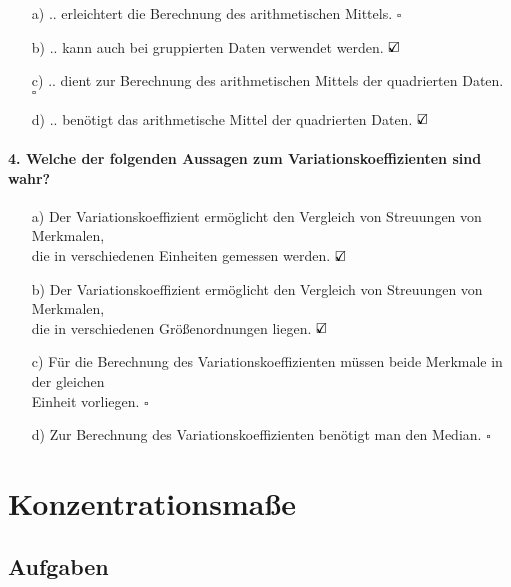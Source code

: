 \documentclass[a4paper]{article}
\begin{document}
\begin{itemize}
    \item[a)] .. erleichtert die Berechnung des arithmetischen Mittels. \hfill $\square$
    \item[b)] .. kann auch bei gruppierten Daten verwendet werden. \hfill $\text{\rlap{$\checkmark$}}\square$
    \item[c)] .. dient zur Berechnung des arithmetischen Mittels der quadrierten Daten. \hfill $\square$
    \item[d)] .. benötigt das arithmetische Mittel der quadrierten Daten. \hfill $\text{\rlap{$\checkmark$}}\square$
\end{itemize}

\paragraph{4. Welche der folgenden Aussagen zum Variationskoeffizienten sind wahr?}

\begin{itemize}
    \item[a)] Der Variationskoeffizient ermöglicht den Vergleich von Streuungen von Merkmalen,\\die in verschiedenen Einheiten gemessen werden. \hfill $\text{\rlap{$\checkmark$}}\square$
    \item[b)] Der Variationskoeffizient ermöglicht den Vergleich von Streuungen von Merkmalen,\\die in verschiedenen Größenordnungen liegen. \hfill $\text{\rlap{$\checkmark$}}\square$
    \item[c)] Für die Berechnung des Variationskoeffizienten müssen beide Merkmale in der gleichen\\Einheit vorliegen. \hfill $\square$
    \item[d)] Zur Berechnung des Variationskoeffizienten benötigt man den Median. \hfill $\square$
\end{itemize}


\clearpage


\section{Konzentrationsmaße}\label{sec:konz}

\subsection{Aufgaben}
\end{document}
